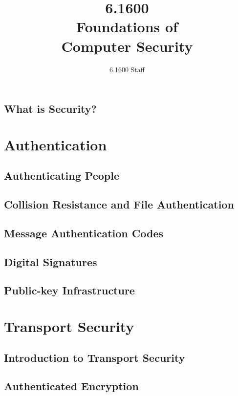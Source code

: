\documentclass[
letterpaper, %
oneside
]{tufte-book}
\author{6.1600 Staff}
\title{6.1600\\Foundations of\\Computer Security}
\begin{document}
\mainmatter

\maketitle

\clearpage

\tableofcontents*
\clearpage


\chapter{What is Security?}



\part{Authentication}
\chapter{Authenticating People}



\chapter{Collision Resistance and File Authentication}



\chapter{Message Authentication Codes}



\chapter{Digital Signatures}



\chapter{Public-key Infrastructure}



\part{Transport Security}

\chapter{Introduction to Transport Security}



\chapter{Authenticated Encryption}




\backmatter



\end{document}
